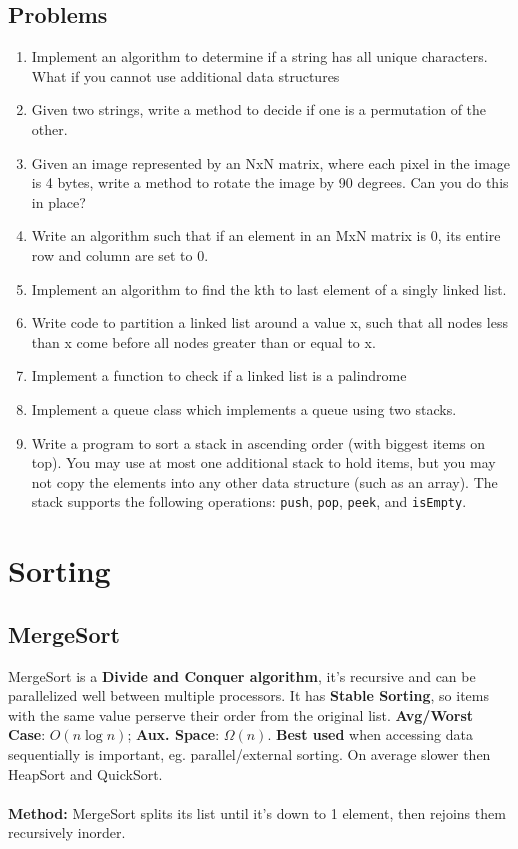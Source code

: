 \documentclass{article}
\begin{document}
\subsection{Problems}
	\begin{enumerate}
		\item Implement an algorithm to determine if a string has all unique characters. What if you cannot use additional data structures
		\item Given two strings, write a method to decide if one is a permutation of the other.
		\item Given an image represented by an NxN matrix, where each pixel in the image is 4 bytes, write a method to rotate the image by 90 degrees. Can you do this in place?
		\item Write an algorithm such that if an element in an MxN matrix is 0, its entire row and column are set to 0.
		\item Implement an algorithm to find the kth to last element of a singly linked list.
		\item Write code to partition a linked list around a value x, such that all nodes less than x come before all nodes greater than or equal to x.
		\item Implement a function to check if a linked list is a palindrome
		\item Implement a queue class which implements a queue using two stacks.
		\item Write a program to sort a stack in ascending order (with biggest items on top). You may use at most one additional stack to hold items, but you may not copy the elements into any other data structure (such as an array). The stack supports the following operations: \texttt{push}, \texttt{pop}, \texttt{peek}, and \texttt{isEmpty}.
	\end{enumerate}




\clearpage
\section{Sorting}


\subsection{MergeSort}
MergeSort is a {\bf Divide and Conquer algorithm}, it's recursive and can be parallelized well between multiple processors. It has {\bf Stable Sorting}, so items with the same value perserve their order from the original list. {\bf Avg/Worst Case}: $O(n \log n)$; {\bf Aux. Space}: $\Omega(n)$. {\bf Best used} when accessing data sequentially is important, eg. parallel/external sorting. On average slower then HeapSort and QuickSort.
\\ \\
{\bf Method:} MergeSort splits its list until it's down to 1 element, then rejoins them recursively inorder.
\end{document}

